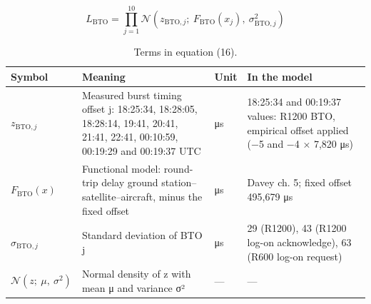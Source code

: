 \begin{equation}
L_{\mathrm{BTO}} = \prod_{j=1}^{10} \mathcal{N}\left(z_{\mathrm{BTO},j};\ F_{\mathrm{BTO}}\left(x_{j}\right),\ \sigma_{\mathrm{BTO},j}^{2}\right)
\label{eq:16}
\end{equation}
\begin{table}[h]
\caption{Terms in equation (16).}
\small
\begin{tabular}{p{2.4cm}p{4.6cm}p{1.1cm}p{4.0cm}}
\hline
Symbol & Meaning & Unit & In the model \\
\hline
$z_{\mathrm{BTO},j}$ & Measured burst timing offset j: 18:25:34, 18:28:05, 18:28:14, 19:41, 20:41, 21:41, 22:41, 00:10:59, 00:19:29 and 00:19:37 UTC & μs & 18:25:34 and 00:19:37 values: R1200 BTO, empirical offset applied (−5 and −4 × 7,820 μs) \\
$F_{\mathrm{BTO}}(x)$ & Functional model: round-trip delay ground station–satellite–aircraft, minus the fixed offset & μs & Davey ch. 5; fixed offset 495,679 μs \\
$\sigma_{\mathrm{BTO},j}$ & Standard deviation of BTO j & μs & 29 (R1200), 43 (R1200 log-on acknowledge), 63 (R600 log-on request) \\
$\mathcal{N}(z;\ \mu,\ \sigma^{2})$ & Normal density of z with mean μ and variance σ² & — & — \\
\hline
\end{tabular}
\end{table}


